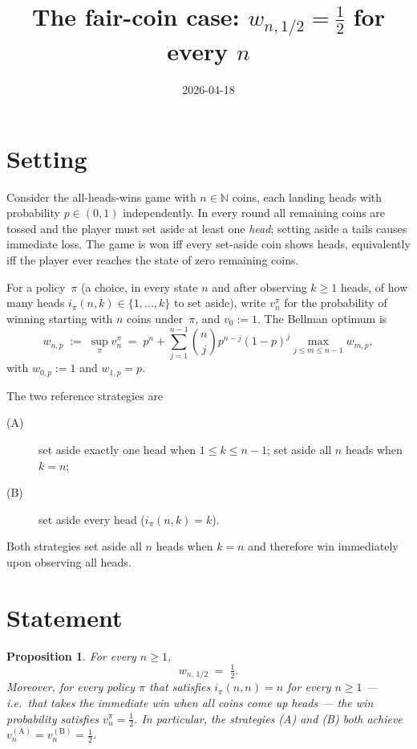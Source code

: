 \documentclass{article}
\title{The fair-coin case: $w_{n,1/2}=\tfrac12$ for every $n$}
\author{}
\date{2026-04-18}
\newtheorem{proposition}{Proposition}
\theoremstyle{remark}
\begin{document}
\maketitle

\section*{Setting}

Consider the all-heads-wins game with $n\in\mathbb N$ coins, each landing
heads with probability $p\in(0,1)$ independently. In every round all
remaining coins are tossed and the player must set aside at least one
\emph{head}; setting aside a tails causes immediate loss. The game is
won iff every set-aside coin shows heads, equivalently iff the player
ever reaches the state of zero remaining coins.

For a policy~$\pi$ (a choice, in every state $n$ and after observing
$k\ge 1$ heads, of how many heads $i_\pi(n,k)\in\{1,\dots,k\}$ to set
aside), write $v_n^\pi$ for the probability of winning starting with
$n$ coins under~$\pi$, and $v_0:=1$. The Bellman optimum is
\[
  w_{n,p}\;:=\;\sup_\pi v_n^\pi\;=\;p^n+\sum_{j=1}^{n-1}\binom{n}{j}p^{n-j}(1-p)^j
  \max_{j\le m\le n-1}w_{m,p},
\]
with $w_{0,p}:=1$ and $w_{1,p}=p$.

The two reference strategies are
\begin{description}
  \item[(A)] set aside exactly one head when $1\le k\le n-1$; set aside
        all $n$ heads when $k=n$;
  \item[(B)] set aside every head ($i_\pi(n,k)=k$).
\end{description}
Both strategies set aside all $n$ heads when $k=n$ and therefore win
immediately upon observing all heads.

\section*{Statement}

\begin{proposition}\label{prop:half}
For every $n\ge 1$,
\begin{equation}\label{eq:wn-half}
  w_{n,\,1/2}\;=\;\tfrac12.
\end{equation}
Moreover, for every policy $\pi$ that satisfies $i_\pi(n,n)=n$ for every
$n\ge 1$ — i.e.\ that takes the immediate win when all coins come up
heads — the win probability satisfies $v_n^\pi=\tfrac12$. In
particular, the strategies (A) and (B) both achieve $v_n^{(\mathrm{A})}=v_n^{(\mathrm{B})}=\tfrac12$.
\end{proposition}
\end{document}
